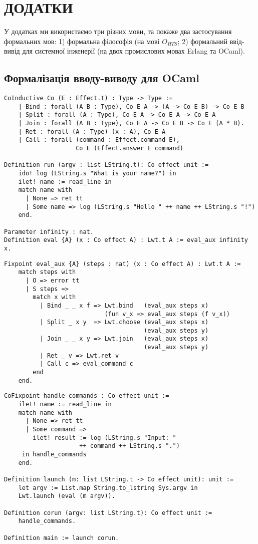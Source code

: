 \chapter{ДОДАТКИ}

У додатках ми використаємо три різних мови, та покаже два застосування
формальних мов: 1) формальна філософія (на мові $O_{HTS}$; 2) формальний ввід-вивід для
системної інженерії (на двох промислових мовах Erlang та OCaml).

\section{Формалізація вводу-виводу для OCaml}

\begin{lstlisting}
CoInductive Co (E : Effect.t) : Type -> Type :=
    | Bind : forall (A B : Type), Co E A -> (A -> Co E B) -> Co E B
    | Split : forall (A : Type), Co E A -> Co E A -> Co E A
    | Join : forall (A B : Type), Co E A -> Co E B -> Co E (A * B).
    | Ret : forall (A : Type) (x : A), Co E A
    | Call : forall (command : Effect.command E),
                    Co E (Effect.answer E command)

Definition run (argv : list LString.t): Co effect unit :=
    ido! log (LString.s "What is your name?") in
    ilet! name := read_line in
    match name with
      | None => ret tt
      | Some name => log (LString.s "Hello " ++ name ++ LString.s "!")
    end.

Parameter infinity : nat.
Definition eval {A} (x : Co effect A) : Lwt.t A := eval_aux infinity x.
\end{lstlisting}

\newpage
\begin{lstlisting}
Fixpoint eval_aux {A} (steps : nat) (x : Co effect A) : Lwt.t A :=
    match steps with
      | O => error tt
      | S steps =>
        match x with
          | Bind _ _ x f => Lwt.bind   (eval_aux steps x)
                            (fun v_x => eval_aux steps (f v_x))
          | Split _ x y  => Lwt.choose (eval_aux steps x)
                                       (eval_aux steps y)
          | Join _ _ x y => Lwt.join   (eval_aux steps x)
                                       (eval_aux steps y)
          | Ret _ v => Lwt.ret v
          | Call c => eval_command c
        end
    end.
\end{lstlisting}

\begin{lstlisting}
CoFixpoint handle_commands : Co effect unit :=
    ilet! name := read_line in
    match name with
      | None => ret tt
      | Some command =>
        ilet! result := log (LString.s "Input: "
                     ++ command ++ LString.s ".")
     in handle_commands
    end.

Definition launch (m: list LString.t -> Co effect unit): unit :=
    let argv := List.map String.to_lstring Sys.argv in
    Lwt.launch (eval (m argv)).

Definition corun (argv: list LString.t): Co effect unit :=
    handle_commands.

Definition main := launch corun.
\end{lstlisting}

